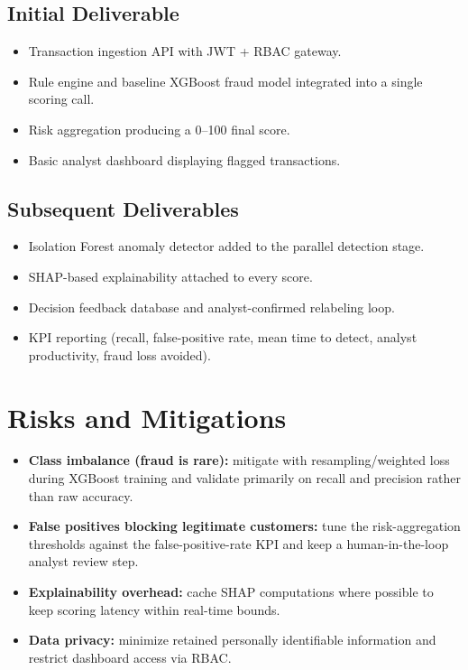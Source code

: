 \documentclass[11pt,letterpaper]{article}
\begin{document}
\subsection{Initial Deliverable}
\begin{itemize}
    \item Transaction ingestion API with JWT + RBAC gateway.
    \item Rule engine and baseline XGBoost fraud model integrated into a single scoring call.
    \item Risk aggregation producing a 0--100 final score.
    \item Basic analyst dashboard displaying flagged transactions.
\end{itemize}

\subsection{Subsequent Deliverables}
\begin{itemize}
    \item Isolation Forest anomaly detector added to the parallel detection stage.
    \item SHAP-based explainability attached to every score.
    \item Decision feedback database and analyst-confirmed relabeling loop.
    \item KPI reporting (recall, false-positive rate, mean time to detect, analyst productivity, fraud loss avoided).
\end{itemize}

\section{Risks and Mitigations}
\begin{itemize}
    \item \textbf{Class imbalance (fraud is rare):} mitigate with resampling/weighted loss during XGBoost training and validate primarily on recall and precision rather than raw accuracy.
    \item \textbf{False positives blocking legitimate customers:} tune the risk-aggregation thresholds against the false-positive-rate KPI and keep a human-in-the-loop analyst review step.
    \item \textbf{Explainability overhead:} cache SHAP computations where possible to keep scoring latency within real-time bounds.
    \item \textbf{Data privacy:} minimize retained personally identifiable information and restrict dashboard access via RBAC.
\end{itemize}
\end{document}
